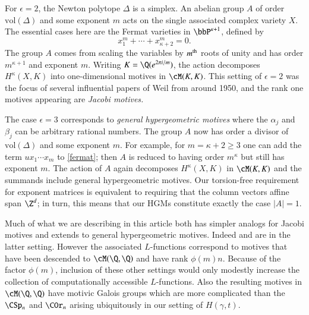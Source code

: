 \documentclass{notices}
\numberwithin{equation}{section}
\numberwithin{table}{section}
\numberwithin{figure}{section}
\begin{document}
{  For $\epsilon=2$, the Newton polytope $\Delta$ is a simplex. 
An abelian group $A$ of order $\mbox{vol}(\Delta)$ 
and some exponent $m$ acts on the single associated 
complex variety $X$.
The essential cases here are the Fermat varieties in 
$\bbP^{\kappa+1}$, defined by 
\begin{equation}
\label{fermat}
x_1^{m} + \cdots + x_{\kappa+2}^m=0.
\end{equation}
The group $A$ comes from scaling the 
variables by $m^{\rm th}$ roots of unity
and has order $m^{\kappa+1}$ and 
exponent $m$.   Writing $K=\Q(e^{2 \pi i/m})$,
the action decomposes $H^{\kappa}(X,K)$
into one-dimensional motives in 
$\cM(K,K)$.   This setting of $\epsilon=2$ 
was the focus of several influential papers 
of Weil from around 1950, and
the rank one motives appearing 
are {\em Jacobi motives.} 

   The case $\epsilon=3$ corresponds to {\em general
hypergeometric motives} where the $\alpha_j$ 
and $\beta_j$ can be arbitrary rational numbers.   The group $A$ now
has order a divisor of $\mbox{vol}(\Delta)$ 
and some exponent $m$.   For example, 
for $m=\kappa+2 \geq 3$ one can add the term
 $u x_1 \cdots x_{m}$ to \eqref{fermat};
 then $A$ is reduced to having order 
$m^{\kappa}$ but still has exponent $m$.  
The action of $A$ again decomposes 
$H^{\kappa}(X,K)$ in $\cM(K,K)$ and the 
summands include general hypergeometric
motives.  Our torsion-free requirement for exponent matrices is 
equivalent to requiring that the column vectors 
affine span $\Z^d$; in turn, this means that our
HGMs constitute exactly the case $|A|=1$.  


Much of what we are describing in this  
article both has simpler analogs for Jacobi motives and 
extends to general hypergeometric motives.  
  Indeed \cite{BH} and 
\cite{Katz-ESDE} are in the latter setting.  
However the associated 
$L$-functions correspond to 
motives that have been descended
to $\cM(\Q,\Q)$ and have rank 
$\phi(m) n$.  Because of the factor
$\phi(m)$, inclusion of these other settings
would only 
modestly increase the 
collection of computationally accessible $L$-functions.
Also the resulting motives in $\cM(\Q,\Q)$
have motivic Galois groups which
are more complicated than 
the $\CSp_n$ and $\COr_n$ arising ubiquitously
in our setting of $H(\gamma,t)$.  



 

  

    

 






}
\end{document}
